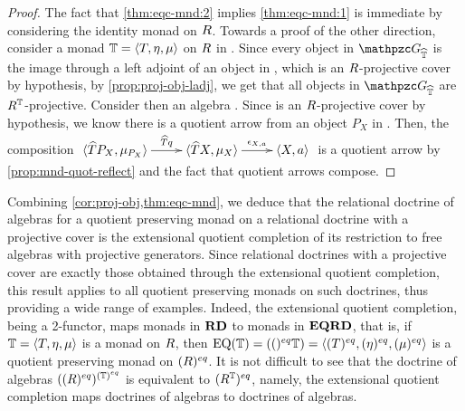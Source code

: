 \begin{proof}
The fact that \cref{thm:eqc-mnd:2} implies \cref{thm:eqc-mnd:1} is immediate by considering the identity monad on $R$. 
Towards a proof of the other direction, 
consider a monad $\mathbb{T} = {\langle T,\eta,\mu \rangle }$ on $R$ in \EQRDtn. 
Since every object in $\ct{G}_{\fn\mnd}$ is the image through a left adjoint of an object in , which is  an $R$-projective cover by hypothesis, 
by \cref{prop:proj-obj-ladj}, we get that all objects in $\ct{G}_{\fn{\mnd}}$ are $R^{\mathbb{T}}$-projective. 
Consider then an algebra . 
Since  is an $R$-projective cover by hypothesis, we know there is a quotient arrow  from an object $P_X$ in . 
Then, the composition 
$\xymatrix{\ple{\fn{T}P_X,\mu_{P_X}}\ar[r]^-{\fn{T}q} & \ple{\fn{T}X,\mu_X}\ar[r]^-{\epsilon_{X,a}} & \ple{X,a}}$
is a quotient arrow by \cref{prop:mnd-quot-reflect} and the fact that quotient arrows compose. 
\end{proof}

Combining \cref{cor:proj-obj,thm:eqc-mnd}, we deduce that 
the relational doctrine of algebras for a quotient preserving monad on   a relational doctrine with a projective cover is the extensional quotient completion  of its restriction to free algebras with projective generators. 
Since relational doctrines with a projective cover are exactly those obtained through the extensional quotient completion, 
this result applies to all quotient preserving monads  on such doctrines, thus providing a wide range of examples. 
 Indeed, the extensional quotient completion, being a 2-functor, maps monads in $\mathbf{RD}$ to monads in $\mathbf{EQRD}$, that is, 
if $\mathbb{T} = {\langle T,\eta,\mu \rangle }$ is a monad on $R$, then $\mathrm{EQ}(\mathbb{T}) = (()^{eq}\mathbb{T}) = {\langle (T)^{eq},(\eta)^{eq},(\mu)^{eq} \rangle }$ is a quotient preserving monad on $(R)^{eq}$. 
It is not difficult to see that the doctrine of algebras $((R)^{eq})^{(\mathbb{T})^{eq}}$ is equivalent to $(R^{\mathbb{T}})^{eq}$, namely, the extensional quotient completion maps doctrines of algebras to doctrines of algebras. 

